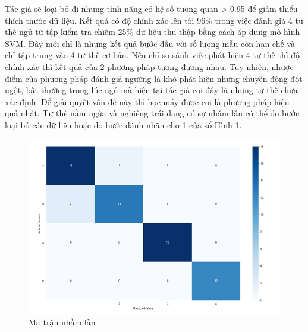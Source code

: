Tác giả sẽ loại bỏ đi những tính năng có hệ số tương quan > 0.95 để giảm thiểu thích thước dữ liệu.
Kết quả có độ chính xác lên tới 96\% trong việc đánh giá 4 tư thế ngủ từ tập kiểm tra chiếm 25\% dữ liệu thu thập bằng cách áp dụng mô hình SVM. Đây mới chỉ là những kết quả bước đầu với số lượng mẫu còn hạn chế và chỉ tập trung vào 4 tư thế cơ bản. Nếu chỉ so sánh việc phát hiện 4 tư thế thì độ chính xác thì kết quả của 2 phương pháp tương đương nhau. Tuy nhiên, nhược điểm của phương pháp đánh giá ngưỡng là khó phát hiện những chuyển động đột ngột, bất thường trong lúc ngủ mà hiện tại tác giả coi đây là những tư thế chưa xác định. Để giải quyết vấn đề này thì học máy được coi là phương pháp hiệu quả nhất. Tư thế nằm ngửa và nghiêng trái đang có sự nhầm lẫn có thể do bước loại bỏ các dữ liệu hoặc do bước đánh nhãn cho 1 cửa sổ Hình \ref{matrannhamlan}. 
\begin{figure} [!]
    \centering
    \includegraphics[width=1\linewidth]{images/matrannhamlan.png}
    \caption{Ma trận nhầm lẫn}
    \label{matrannhamlan}
\end{figure}